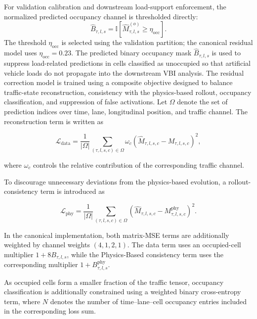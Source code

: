 \documentclass[journal]{IEEEtran}
\begin{document}
{\color{blue}
For validation calibration and downstream load-support enforcement, the normalized predicted occupancy channel is thresholded directly:
\begin{equation}
\widehat{B}_{\tau,l,s}
=
\mathbb{I}\left[
\widehat{M}_{\tau,l,s}^{(o)}
\geq \eta_{\mathrm{occ}}
\right].
\label{eq:predicted_binary_occupancy}
\end{equation}
The threshold $\eta_{\mathrm{occ}}$ is selected using the validation partition; the canonical residual model uses $\eta_{\mathrm{occ}}=0.23$. The predicted binary occupancy mask \(\hat B_{\tau,l,s}\) is used to suppress load-related predictions in cells classified as unoccupied so that artificial vehicle loads do not propagate into the downstream VBI analysis.
}
The residual correction model is trained using a composite objective designed to balance traffic-state reconstruction, consistency with the physics-based rollout, occupancy classification, and suppression of false activations. Let $\Omega$ denote the set of prediction indices over time, lane, longitudinal position, and traffic channel. The reconstruction term is written as

\begin{equation}
\mathcal{L}_{\mathrm{data}}
=
\frac{1}{|\Omega|}
\sum_{(\tau,l,s,c)\in\Omega}
\omega_c
\left(
\widehat{M}_{\tau,l,s,c}
-
M_{\tau,l,s,c}
\right)^2,
\end{equation}

where $\omega_c$ controls the relative contribution of the corresponding traffic channel.

To discourage unnecessary deviations from the physics-based evolution, a rollout-consistency term is introduced as

\begin{equation}
\mathcal{L}_{\mathrm{phy}}
=
\frac{1}{|\Omega|}
\sum_{(\tau,l,s,c)\in\Omega}
\left(
\widehat{M}_{\tau,l,s,c}
-
M_{\tau,l,s,c}^{\mathrm{phy}}
\right)^2.
\end{equation}

{\color{blue}In the canonical implementation, both matrix-MSE terms are additionally weighted by channel weights $(4,1,2,1)$. The data term uses an occupied-cell multiplier $1+8B_{\tau,l,s}$, while the Physics-Based consistency term uses the corresponding multiplier $1+B_{\tau,l,s}^{\mathrm{phy}}$.}

As occupied cells form a smaller fraction of the traffic tensor, occupancy classification is additionally constrained using a weighted binary cross-entropy term, where $N$ denotes the number of time--lane--cell occupancy entries included in the corresponding loss sum.
\end{document}
